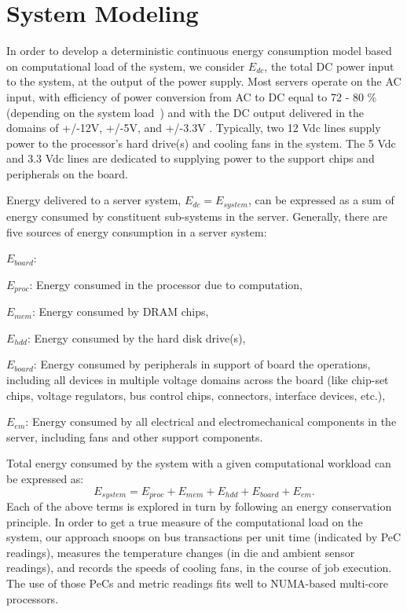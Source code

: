 \documentclass[prodmode,acmtaco,pdftex]{acmsmall}
\begin{document}
\section{System Modeling}
\label{sec:modelstruct}
In order to develop a deterministic continuous energy consumption model
based on computational load of the system, we consider $E_{dc}$, the
total DC power input to the system, at the output of the power supply.
Most servers operate on the AC input, with efficiency of power
conversion from AC to DC equal to 72 - 80 \% (depending on the system
load~\cite{ton2008}) and with the DC output delivered in the domains of
+/-12V, +/-5V, and +/-3.3V \cite{SSI2004}.  Typically, two 12 Vdc lines
supply power to the processor's hard drive(s) and cooling fans in the
system.  The 5 Vdc and 3.3 Vdc lines are dedicated to supplying power to
the support chips and peripherals on the board.

Energy delivered to a server system, $E_{dc} = E_{system}$, can be
expressed as a sum of energy consumed by constituent sub-systems in the
server.  Generally, there are five sources of energy consumption in a
server system:
\begin{describe}{{\em $E_{board}$\/}:}
\item{$E_{proc}$:} Energy consumed in the processor due to computation,
\item{$E_{mem}$:} Energy consumed by DRAM chips,
\item{$E_{hdd}$:} Energy consumed by the hard disk drive(s),
\item{$E_{board}$:} Energy consumed by peripherals in support of board the
  operations, including all devices in multiple voltage domains across the board
  (like chip-set chips, voltage regulators, bus control chips, connectors, interface devices, etc.),
\item{$E_{em}$:} Energy consumed by all electrical and electromechanical
  components in the server, including fans and other support components.
\end{describe}

Total energy consumed by the system with a given computational workload
can be expressed as:
\begin{equation}
\label{eq:linmodel}
E_{system}= E_{proc} + E_{mem} + E_{hdd}+ E_{board} +  E_{em}.
\end{equation}
Each of the above terms is explored in turn by following an energy
conservation principle.  In order to get a true measure of the
computational load on the system, our approach snoops on bus
transactions per unit time (indicated by PeC readings), measures the
temperature changes (in die and ambient sensor readings), and records
the speeds of cooling fans, in the course of job execution.  The use of
those PeCs and metric readings fits well to NUMA-based multi-core
processors. 
\end{document}
